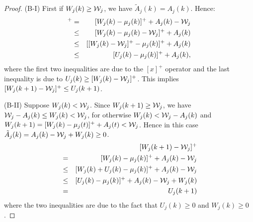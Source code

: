 \documentclass[journal]{IEEEtran}
\newcommand{\script}[1]{{{\cal{#1} }}}
\begin{document}
\begin{proof}
(B-I) First if $W_j(k)\geq\script{W}_j$, we have $\tilde{A}_j(k)=A_j(k)$. Hence:
\begin{eqnarray*}
[W_j(k+1)-\script{W}_j]^+
&=&[W_j(k)-\mu_j(k)]^++A_j(k)-\script{W}_j\\
&\leq& [W_j(k)-\mu_j(k)-\script{W}_j]^++A_j(k)\\
&\leq& [[W_j(k)-\script{W}_j]^+-\mu_j(k)]^++A_j(k)\\
&\leq& [U_j(k)-\mu_j(k)]^++A_j(k),
\end{eqnarray*}
where the first two inequalities are due to the $[x]^+$ operator and the last inequality is due to $U_j(k)\geq[W_j(k)-\script{W}_j]^+$. This implies $[W_j(k+1)-\script{W}_j]^+\leq U_j(k+1)$.

(B-II) Suppose $W_j(k)<\script{W}_j$. Since $W_j(k+1)\geq\script{W}_j$, we have $\script{W}_j-A_j(k)\leq W_j(k)< \script{W}_j$, for otherwise $W_j(k)<\script{W}_j-A_j(k)$ and $W_j(k+1)=[W_j(k)-\mu_j(t)]^++A_j(t)<\script{W}_j$. Hence in this case $\tilde{A}_j(k)=A_j(k)-\script{W}_j+W_j(k)\geq0$. %
\begin{eqnarray*}
&&[W_j(k+1)-\script{W}_j]^+\\
&=&[W_j(k)-\mu_j(k)]^++A_j(k)-\script{W}_j\\
&\leq&[W_j(k)+U_j(k)-\mu_j(k)]^++A_j(k)-\script{W}_j\\
&\leq&[U_j(k)-\mu_j(k)]^++A_j(k)-\script{W}_j+W_j(k)\\
&=& U_j(k+1)
\end{eqnarray*}
where the two inequalities are due to the fact that $U_j(k)\geq0$ and $W_j(k)\geq0$. %
\end{proof}
\end{document}
